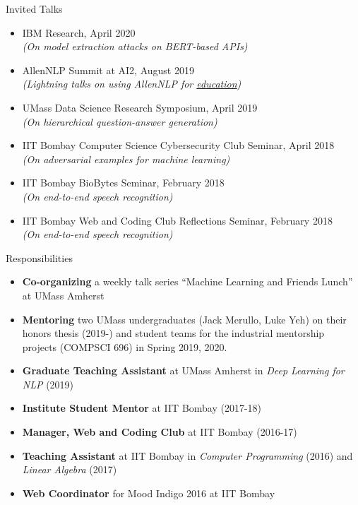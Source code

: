 \documentclass{resume} %
\begin{document}
\begin{rSection}{Invited Talks}
\vspace*{0.1in}
\begin{itemize}[leftmargin=*]
\item IBM Research, April 2020\\
\textit{(On model extraction attacks on BERT-based APIs)}
\item AllenNLP Summit at AI2, August 2019 \\
\textit{(Lightning talks on using AllenNLP for \href{https://github.com/martiansideofthemoon/allennlp-probe-hw}{education})}
\item UMass Data Science Research Symposium, April 2019 \\
\textit{(On hierarchical question-answer generation)}
\item IIT Bombay Computer Science Cybersecurity Club Seminar, April 2018 \\
\textit{(On adversarial examples for machine learning)}
\item IIT Bombay BioBytes Seminar, February 2018\\
\textit{(On end-to-end speech recognition)}
\item IIT Bombay Web and Coding Club Reflections Seminar, February 2018 \\
\textit{(On end-to-end speech recognition)}
\end{itemize}
\end{rSection}

\pagebreak
\begin{rSection}{Responsibilities}
\vspace*{0.1in}
\begin{itemize}[leftmargin=*]
\item \textbf{Co-organizing} a weekly talk series ``Machine Learning and Friends Lunch'' at UMass Amherst
\item \textbf{Mentoring} two UMass undergraduates (Jack Merullo, Luke Yeh) on their honors thesis (2019-) and student teams for the industrial mentorship projects (COMPSCI 696) in Spring 2019, 2020.
\item \textbf{Graduate Teaching Assistant} at UMass Amherst in \textit{Deep Learning for NLP} (2019)
\item \textbf{Institute Student Mentor} at IIT Bombay (2017-18)
\item \textbf{Manager, Web and Coding Club} at IIT Bombay (2016-17)
\item \textbf{Teaching Assistant} at IIT Bombay in \textit{Computer Programming} (2016) and \textit{Linear Algebra} (2017)
\item \textbf{Web Coordinator} for Mood Indigo 2016 at IIT Bombay
\end{itemize}
\end{rSection}
\end{document}
